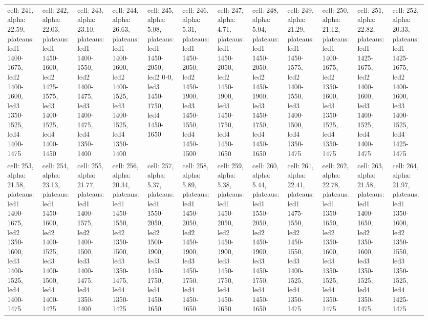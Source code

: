 \documentclass{article}
\begin{document}
\begin{landscape}
\begin{longtable}{|p{1.5cm}|p{1.5cm}|p{1.5cm}|p{1.5cm}|p{1.5cm}|p{1.5cm}|p{1.5cm}|p{1.5cm}|p{1.5cm}|p{1.5cm}|p{1.5cm}|p{1.5cm}|}
\rowcolor{lightgray} cell: 241, alpha: 22.59, plateaus: led1 1400-1675, led2 1400-1600, led3 1350-1525, led4 1400-1475 &cell: 242, alpha: 22.03, plateaus: led1 1450-1600, led2 1425-1575, led3 1400-1525, led4 1400-1450 &cell: 243, alpha: 23.10, plateaus: led1 1400-1550, led2 1400-1475, led3 1400-1475, led4 1350-1400 &cell: 244, alpha: 26.63, plateaus: led1 1400-1600, led2 1400-1525, led3 1400-1525, led4 1350-1400 &cell: 245, alpha: 5.08, plateaus: led1 1450-2050, led2 0-0, led3 1450-1750, led4 1450-1650 &cell: 246, alpha: 5.31, plateaus: led1 1450-2050, led2 1450-1900, led3 1450-1550, led4 1450-1500 &cell: 247, alpha: 4.71, plateaus: led1 1450-2050, led2 1450-1900, led3 1450-1750, led4 1450-1650 &cell: 248, alpha: 5.04, plateaus: led1 1450-2050, led2 1450-1900, led3 1450-1750, led4 1450-1650 &cell: 249, alpha: 21.29, plateaus: led1 1450-1575, led2 1400-1550, led3 1400-1500, led4 1350-1475 &cell: 250, alpha: 21.12, plateaus: led1 1400-1675, led2 1350-1600, led3 1350-1525, led4 1350-1475 &cell: 251, alpha: 22.82, plateaus: led1 1425-1675, led2 1400-1600, led3 1400-1525, led4 1400-1475 &cell: 252, alpha: 20.33, plateaus: led1 1425-1675, led2 1400-1600, led3 1400-1525, led4 1425-1475 \\
cell: 253, alpha: 21.58, plateaus: led1 1400-1675, led2 1350-1600, led3 1400-1525, led4 1400-1475 &cell: 254, alpha: 23.13, plateaus: led1 1450-1600, led2 1400-1525, led3 1400-1500, led4 1400-1425 &cell: 255, alpha: 21.77, plateaus: led1 1400-1575, led2 1400-1500, led3 1400-1475, led4 1350-1400 &cell: 256, alpha: 20.34, plateaus: led1 1450-1550, led2 1350-1500, led3 1350-1475, led4 1350-1425 &cell: 257, alpha: 5.37, plateaus: led1 1550-2050, led2 1500-1900, led3 1450-1750, led4 1450-1650 &cell: 258, alpha: 5.89, plateaus: led1 1450-2050, led2 1450-1900, led3 1450-1750, led4 1450-1650 &cell: 259, alpha: 5.38, plateaus: led1 1450-2050, led2 1450-1900, led3 1450-1750, led4 1450-1650 &cell: 260, alpha: 5.44, plateaus: led1 1550-2050, led2 1450-1900, led3 1450-1750, led4 1450-1650 &cell: 261, alpha: 22.41, plateaus: led1 1475-1550, led2 1450-1550, led3 1400-1525, led4 1350-1475 &cell: 262, alpha: 22.78, plateaus: led1 1350-1650, led2 1350-1600, led3 1350-1525, led4 1350-1475 &cell: 263, alpha: 21.58, plateaus: led1 1400-1650, led2 1350-1600, led3 1350-1525, led4 1350-1475 &cell: 264, alpha: 21.97, plateaus: led1 1350-1600, led2 1350-1550, led3 1350-1525, led4 1425-1475 \\

\end{longtable}
\end{landscape}
\end{document}
